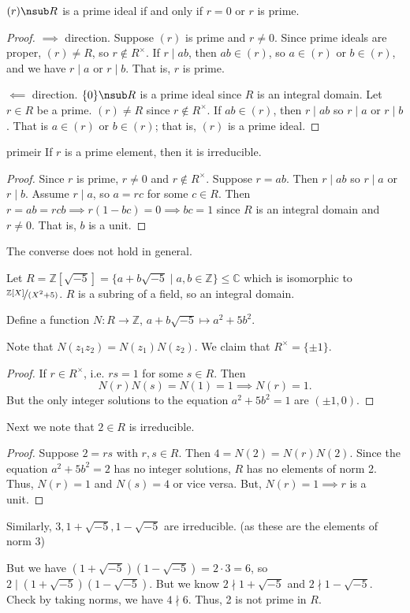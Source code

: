 \begin{lemma}{}{}
    \((r) \nsub R\) is a prime ideal if and only if \(r = 0\) or \(r\) is prime.
\end{lemma}
\begin{proof}
    \(\implies\) direction. Suppose \((r)\) is prime and \(r \neq 0\). Since prime ideals are proper, \((r) \neq R\), so \(r \notin R^\times \). If \(r \mid ab\), then \(ab \in (r)\), so \(a \in (r)\) or \(b \in (r)\), and we have \(r\mid a\) or \(r \mid b\). That is, \(r\) is prime.

    \(\impliedby\) direction. \(\{0\}\nsub R\) is a prime ideal since \(R\) is an integral domain. Let \(r \in R\) be a prime. \((r) \neq R\) since \(r \notin R^\times \). If \(ab \in (r)\), then \(r \mid ab\) so \(r \mid a\) or \(r \mid b\). That is \(a \in (r)\) or \(b \in (r)\); that is, \((r)\) is a prime ideal.
\end{proof}
\begin{lemma}{}{primeir}
    If \(r\) is a prime element, then it is irreducible.
\end{lemma}
\begin{proof}
    Since \(r\) is prime, \(r\neq 0\) and \(r \notin R^\times \). Suppose \(r = ab\). Then \(r \mid ab\) so \(r \mid a\) or \(r \mid b\). Assume \(r \mid a\), so \(a = rc\) for some \(c \in R\). Then \(r = ab = rcb\implies r(1-bc)=0\implies bc = 1\) since \(R\) is an integral domain and \(r\neq 0\). That is, \(b\) is a unit.
\end{proof}
The converse does not hold in general.
\begin{example}
    Let \(R=\mathbb{Z}[\sqrt{-5}] = \{a + b\sqrt{-5} \mid a,b \in \mathbb{Z}\}\leq \mathbb{C}\) which is isomorphic to \(\nicefrac{\mathbb{Z}[X]}{(X^2 + 5)}\). \(R\) is a subring of a field, so an integral domain.

    Define a function \(N: R \to \mathbb{Z}\), \(a + b\sqrt{-5} \mapsto a^2 + 5b^2\).

    Note that \(N(z_1 z_2) = N(z_1) N(z_2)\). We claim that \(R^\times = \{\pm 1\}\).
    \begin{proof}
        If \(r \in R^\times \), i.e. \(rs = 1\) for some \(s \in R\). Then
        \[
            N(r)N(s) = N(1) = 1 \implies N(r) = 1.
        \]
        But the only integer solutions to the equation \(a^2 + 5b^2 = 1\) are \((\pm 1,0)\).
    \end{proof}
    Next we note that \(2 \in R\) is irreducible.
    \begin{proof}
        Suppose \(2 = rs\) with \(r,s \in R\). Then \(4 = N(2) = N(r)N(2)\). Since the equation \(a^2 + 5b^2 = 2\) has no integer solutions, \(R\) has no elements of norm 2. Thus, \(N(r) = 1\) and \(N(s) = 4\) or vice versa. But, \(N(r) = 1 \implies r\) is a unit.
    \end{proof}
    Similarly, \(3,1 + \sqrt{-5}, 1 - \sqrt{-5} \) are irreducible. (as these are the elements of norm 3)
    
    But we have \((1+\sqrt{-5} )(1-\sqrt{-5}) = 2 \cdot 3 = 6\), so \(2 \mid (1 + \sqrt{-5})(1 - \sqrt{-5})\). But we know \(2 \nmid 1 + \sqrt{-5} \) and \(2 \nmid 1 - \sqrt{-5} \). Check by taking norms, we have \(4 \nmid 6\). Thus, 2 is not prime in \(R\).
\end{example}
